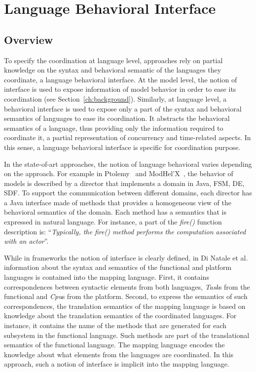 \section{Language Behavioral Interface}
\subsection{Overview}
To specify the coordination at language level, approaches rely on partial knowledge on the syntax and behavioral semantic of the languages they coordinate, \ie a language behavioral interface. At the model level, the notion of interface is used to expose information of model behavior in order to ease its coordination (see Section~\ref{ch:background}). Similarly, at language level, a behavioral interface is used to expose only a part of the syntax and behavioral semantics of languages to ease its coordination. It abstracts the behavioral semantics of a language, thus providing only the information required to coordinate it, \ie a partial representation of concurrency and time-related aspects. In this sense, a language behavioral interface is specific for coordination purpose.    

In the state-of-art approaches, the notion of language behavioral varies depending on the approach. For example in Ptolemy~\cite{ptoleframebib} and ModHel'X~\cite{modhelxbib}, the behavior of models is described by a director that implements a domain in Java, \eg FSM, DE, SDF. To support the communication between different domains, each director has a Java interface made of methods that provides a homogeneous view of the behavioral semantics of the domain. Each method has a semantics that is expressed in natural language. For instance, a part of the \emph{fire()} function description is: ``\emph{Typically, the fire() method performs the computation associated with an actor}''.
 	
While in frameworks the notion of interface is clearly defined, in Di Natale et al.~\cite{dinatale} information about the syntax and semantics of the functional and platform languages is contained into the mapping language. First, it contains correspondences between syntactic elements from both languages, \eg \emph{Task}s from the functional and \emph{Cpu}s from the platform. Second, to express the semantics of such correspondences, the translation semantics of the mapping language is based on knowledge about the translation semantics of the coordinated languages. For instance, it contains the name of the methods that are generated for each subsystem in the functional language. Such methods are part of the translational semantics of the functional language. The mapping language encodes the knowledge about what elements from the languages are coordinated. In this approach, such a notion of interface is implicit into the mapping language. 


